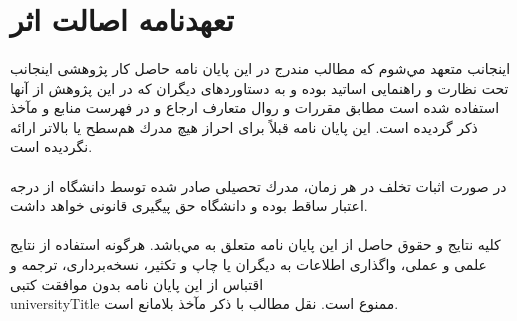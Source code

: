 
\thispagestyle{empty}

\section*{تعهدنامه اصالت اثر}

\paragraph*{}
اینجانب \reportAuthor متعهد مي‌شوم كه مطالب مندرج در این پایان نامه حاصل كار پژوهشی اینجانب تحت نظارت و راهنمایی اساتید \universityTitle بوده و به دستاوردهای دیگران كه در این پژوهش از آنها استفاده شده است مطابق مقررات و روال متعارف ارجاع و در فهرست منابع و مآخذ ذكر گردیده است. این پایان نامه قبلاً برای احراز هیچ مدرك هم‌سطح یا بالاتر ارائه نگردیده است.

\paragraph*{}
در صورت اثبات تخلف در هر زمان، مدرك تحصیلی صادر شده توسط دانشگاه از درجه اعتبار ساقط بوده و دانشگاه حق پیگیری قانونی خواهد داشت.

\paragraph*{}
كلیه نتایج و حقوق حاصل از این پایان نامه متعلق به \universityTitle مي‌باشد. هرگونه استفاده از نتایج علمی و عملی، واگذاری اطلاعات به دیگران یا چاپ و تكثیر، نسخه‌برداری، ترجمه و اقتباس از این پایان نامه بدون موافقت كتبی \\universityTitle ممنوع است. نقل مطالب با ذكر مآخذ بلامانع است.

\paragraph*{} \paragraph*{} \paragraph*{}

\begin{center}
\reportAuthor
\end{center}
